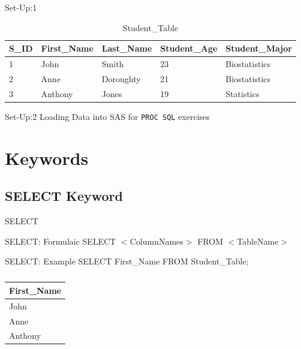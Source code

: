\documentclass{beamer}
\begin{document}
	\begin{frame}{Set-Up:1 }
		\begin{minipage}{1 \textwidth}
\begin{table}[H]
	\centering
	\caption{Student\_Table}

	\begin{tabular}{|l|l|l|l|l|}
		\hline
		S\_ID & First\_Name & Last\_Name & Student\_Age & Student\_Major \\ \hline
		1           & John        & Smith      & 23           & Biostatistics  \\ \hline
		2           & Anne        & Doroughty  & 21           & Biostatistics  \\ \hline
		3           & Anthony     & Jones      & 19           & Statistics     \\ \hline
	\end{tabular}
\end{table}	
		\end{minipage}
\end{frame}

\begin{frame}{Set-Up:2}
	Loading Data into SAS for \texttt{PROC SQL} exercises
\end{frame}
	
	\section{Keywords}
	
	\subsection{SELECT Keyword}
	\begin{frame}{SELECT}
		\begin{block}{SELECT: Formulaic}
			SELECT $<$ColumnNames$>$ FROM $<$TableName$>$ 
		\end{block}
		\begin{block}{SELECT: Example}
			SELECT First\_Name FROM Student\_Table;
		\end{block}
\begin{table}[H]
	\centering
	\caption*{}

	\begin{tabular}{|l|}
		\hline
		 First\_Name  \\ \hline
			John \\ \hline
			Anne  \\ \hline
			Anthony  \\    \hline
	\end{tabular}
\end{table}			
	\end{frame}
	
\end{document}
